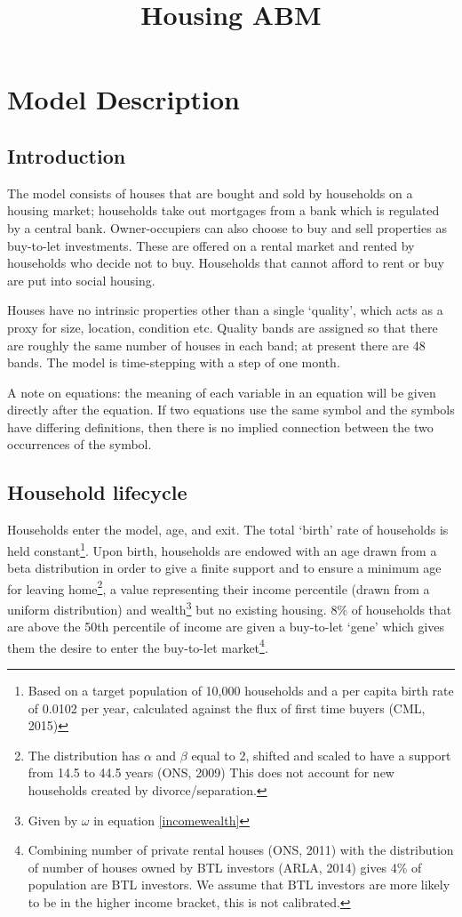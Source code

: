 \documentclass{report}
\begin{document}
\title{Housing ABM}
\maketitle
\tableofcontents
\chapter{Model Description}

\section{Introduction}
The model consists of houses that are bought and sold by households on a housing market; households take out mortgages from a bank which is regulated by a central bank. Owner-occupiers can also choose to buy and sell properties as buy-to-let investments. These are offered on a rental market and rented by households who decide not to buy. Households that cannot afford to rent or buy are put into social housing.

Houses have no intrinsic properties other than a single `quality', which acts as a proxy for size, location, condition etc. Quality bands are assigned so that there are roughly the same number of houses in each band; at present there are 48 bands. The model is time-stepping with a step of one month.

A note on equations: the meaning of each variable in an equation will be given directly after the equation. If two equations use the same symbol and the symbols have differing definitions, then there is no implied connection between the two occurrences of the symbol.

\section{Household lifecycle}
\label{lifecycle}
Households enter the model, age, and exit. The total `birth' rate of households is held constant\footnote{Based on a target population of 10,000 households and a per capita birth rate of 0.0102 per year, calculated against the flux of first time buyers (CML, 2015)}. Upon birth, households are endowed with an age drawn from a beta distribution in order to give a finite support and to ensure a minimum age for leaving home\footnote{The distribution has $\alpha$ and $\beta$ equal to 2, shifted and scaled to have a support from 14.5 to 44.5 years (ONS, 2009) This does not account for new households created by divorce/separation.}, a value representing their income percentile (drawn from a uniform distribution) and wealth\footnote{Given by $\omega$ in equation \ref{incomewealth}} but no existing housing. 8\% of households that are above the 50th percentile of income are given a buy-to-let `gene' which gives them the desire to enter the buy-to-let market\footnote{Combining number of private rental houses (ONS, 2011) with the distribution of number of houses owned by BTL investors (ARLA, 2014) gives 4\% of population are BTL investors. We assume that BTL investors are more likely to be in the higher income bracket, this is not calibrated.}.
\end{document}
